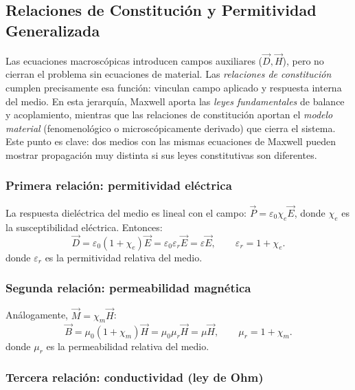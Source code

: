 \documentclass[12pt, a4paper]{article}
\theoremstyle{plain}
\theoremstyle{definition}
\theoremstyle{remark}
\newcommand{\ve}[1]{\vec{#1}}
\begin{document}
\subsection{Relaciones de Constitución y Permitividad Generalizada}

Las ecuaciones macroscópicas introducen campos auxiliares ($\ve{D},\ve{H}$),
pero no cierran el problema sin ecuaciones de material. Las
\emph{relaciones de constitución} cumplen precisamente esa función: vinculan
campo aplicado y respuesta interna del medio.
En esta jerarquía, Maxwell aporta las \emph{leyes fundamentales} de balance y
acoplamiento, mientras que las relaciones de constitución aportan el
\emph{modelo material} (fenomenológico o microscópicamente derivado) que cierra
el sistema.
Este punto es clave: dos medios con las mismas ecuaciones de Maxwell pueden
mostrar propagación muy distinta si sus leyes constitutivas son diferentes.

\subsubsection{Primera relación: permitividad eléctrica}

La respuesta dieléctrica del medio es lineal con el campo:
$\ve{P} = \varepsilon_0\chi_e\ve{E}$, donde $\chi_e$ es la susceptibilidad
eléctrica. Entonces:
\begin{equation}
  \ve{D} = \varepsilon_0(1+\chi_e)\ve{E}
         = \varepsilon_0\varepsilon_r\ve{E}
         = \varepsilon\ve{E}, \qquad
  \varepsilon_r = 1+\chi_e. \label{eq:const1}
\end{equation}
donde $\varepsilon_r$ es la permitividad relativa del medio.

\subsubsection{Segunda relación: permeabilidad magnética}

Análogamente, $\ve{M} = \chi_m\ve{H}$:
\begin{equation}
  \ve{B} = \mu_0(1+\chi_m)\ve{H}
         = \mu_0\mu_r\ve{H}
         = \mu\ve{H}, \qquad
  \mu_r = 1+\chi_m. \label{eq:const2}
\end{equation}
donde $\mu_r$ es la permeabilidad relativa del medio.

\subsubsection{Tercera relación: conductividad (ley de Ohm)}
\end{document}
